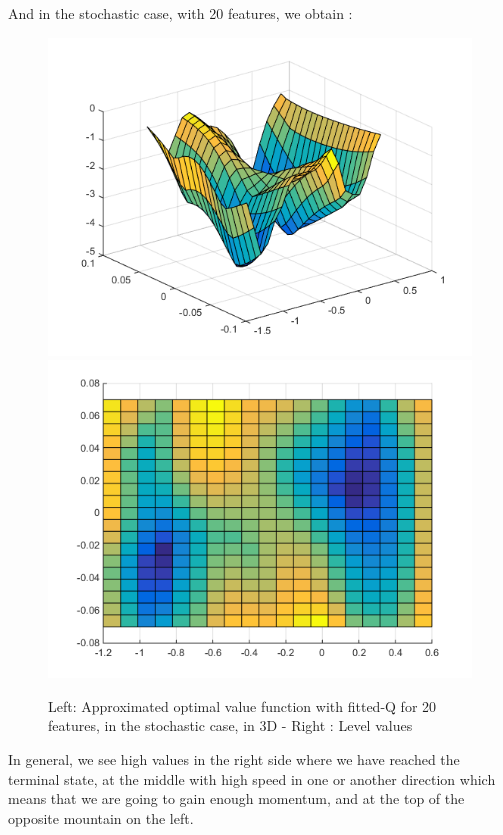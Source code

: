 \documentclass[a4paper, 12pt]{article}
\begin{document}
And in the stochastic case, with 20 features, we obtain :
\begin{figure}[H]
	\centering
	\noindent\includegraphics[scale=0.3]{fittedQ-5ep-5000draws-stochastic.png}
	\noindent\includegraphics[scale=0.3]{fittedQ-5ep-5000draws-stochastic-levels.png}
	\caption{Left: Approximated optimal value function with fitted-Q for 20 features, in the stochastic case, in 3D - Right : Level values}
\end{figure}

In general, we see high values in the right side where we have reached the terminal state, at the middle with high speed in one or another direction which means that we are going to gain enough momentum, and at the top of the opposite mountain on the left.
\end{document}
